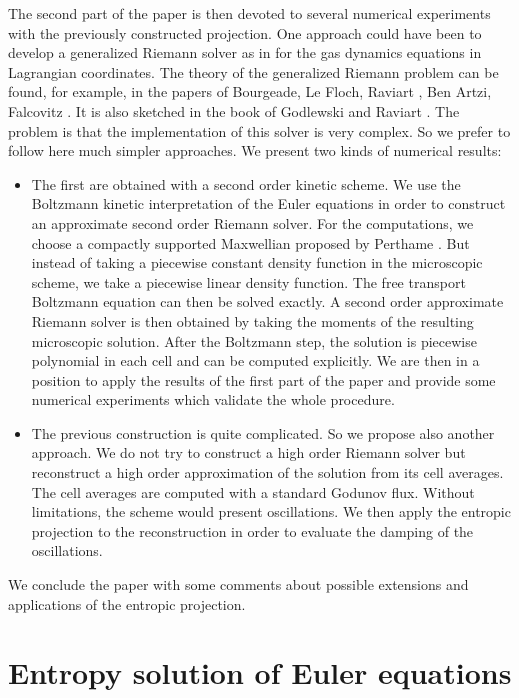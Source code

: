 \documentclass{fldauth}
\theoremstyle{plain}
\theoremstyle{plain}
\theoremstyle{plain}
\theoremstyle{plain}
\theoremstyle{plain}
\theoremstyle{plain}
\begin{document}
The second part of the paper is then devoted to several numerical
experiments with the previously constructed projection. One
approach could have been to develop a generalized Riemann solver
as in \cite{coquel_lefloch95} for the gas dynamics equations in
Lagrangian coordinates. The theory of the generalized Riemann
problem can be found, for example, in the papers of Bourgeade, Le
Floch, Raviart \cite{bourgeade89}, Ben Artzi, Falcovitz
\cite{benartzi86}. It is also sketched in the book of Godlewski
and Raviart \cite{raviart}. The problem is that the implementation
of this solver is very complex. So we prefer to follow here much
simpler approaches. We present two kinds of numerical results:
\begin{itemize}
    \item The first are obtained with a second order kinetic scheme.
    We use the Boltzmann kinetic interpretation of the Euler equations in
    order to construct an approximate second order Riemann solver.
    For the computations, we choose a compactly
supported Maxwellian proposed by Perthame \cite{perthame90}. But
instead of taking a piecewise constant density function in the
microscopic scheme, we take a piecewise linear density function.
The free transport Boltzmann equation can then be solved exactly.
A second order approximate Riemann solver is then obtained by
taking the moments of the resulting microscopic solution. After
the Boltzmann step, the solution is piecewise polynomial in each
cell and can be computed explicitly. We are then in a position to
apply the results of the first part of the paper and provide some
numerical experiments which validate the whole procedure.
    \item The previous construction is quite complicated. So we
    propose also another approach. We do not try to construct a
    high order Riemann solver but reconstruct a high order
    approximation of the solution from its cell averages. The cell
    averages are computed with a standard Godunov flux. Without
    limitations, the scheme would present oscillations. We then
    apply the entropic projection to the reconstruction in order
    to evaluate the damping of the oscillations.
\end{itemize}

We conclude the paper with some comments about possible extensions
and applications of the entropic projection.

\section{Entropy solution of Euler equations}
\end{document}
